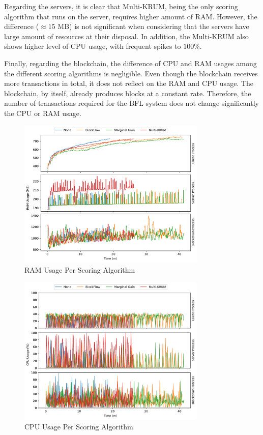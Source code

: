 Regarding the servers, it is clear that Multi-KRUM, being the only scoring algorithm that runs on the server, requires higher amount of RAM. However, the difference ($\approx 15$ MB) is not significant when considering that the servers have large amount of resources at their disposal. In addition, the Multi-KRUM also shows higher level of CPU usage, with frequent spikes to $100\%$.

Finally, regarding the blockchain, the difference of CPU and RAM usages among the different scoring algorithms is negligible. Even though the blockchain receives more transactions in total, it does not reflect on the RAM and CPU usage. The blockchain, by itself, already produces blocks at a constant rate. Therefore, the number of transactions required for the BFL system does not change significantly the CPU or RAM usage.

\begin{figure}[!hpt]
    \centering
    \centering
    \includegraphics[width=0.8\textwidth]{graphics/scoring/ram.pdf}
    \caption{RAM Usage Per Scoring Algorithm}
    \label{fig:ram_scoring}
\end{figure}

\begin{figure}[!hpb]
    \centering
    \centering
    \includegraphics[width=0.8\textwidth]{graphics/scoring/cpu.pdf}
    \caption{CPU Usage Per Scoring Algorithm}
    \label{fig:cpu_scoring}
\end{figure}

